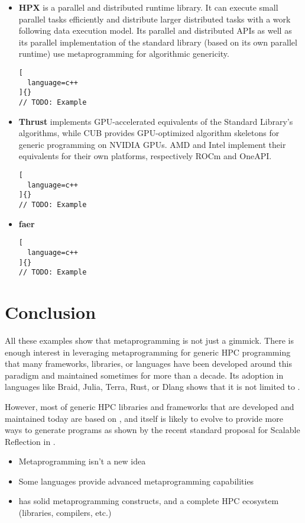 \documentclass[../main]{subfiles}
\begin{document}
\begin{itemize}
\begin{lstlisting}[
  language=c++
]{}
// TODO: Example
\end{lstlisting}

\item
\textbf{HPX} \cite{hpx} is a \cpp parallel and distributed runtime library.
It can execute small parallel tasks efficiently and distribute
larger distributed tasks with a work following data execution model.
Its parallel and distributed APIs as well as its parallel implementation of
the standard library (based on its own parallel runtime) use metaprogramming
for algorithmic genericity.

\begin{lstlisting}[
  language=c++
]{}
// TODO: Example
\end{lstlisting}

\item
\textbf{Thrust} \cite{thrust} implements GPU-accelerated equivalents
of the Standard Library's algorithms, while CUB \cite{cub} provides
GPU-optimized algorithm skeletons for generic programming on NVIDIA GPUs.
AMD and Intel implement their equivalents for their own platforms, respectively
ROCm and OneAPI.

\begin{lstlisting}[
  language=c++
]{}
// TODO: Example
\end{lstlisting}

\item
\textbf{faer} \cite{faer}

\begin{lstlisting}[
  language=c++
]{}
// TODO: Example
\end{lstlisting}

\end{itemize}

\section{
  Conclusion
}

All these examples show that metaprogramming is not just a gimmick.
There is enough interest in leveraging metaprogramming
for generic HPC programming that many frameworks, libraries, or languages
have been developed around this paradigm and maintained sometimes
for more than a decade. Its adoption in languages like Braid, Julia, Terra,
Rust, or Dlang shows that it is not limited to \cpp.

However, most of generic HPC libraries and frameworks that are developed
and maintained today are based on \cpp, and \cpp itself is likely to
evolve to provide more ways to generate programs as shown by the recent
standard proposal for Scalable Reflection in \cpp \cite{scalable-reflection}.

\begin{itemize}
\item Metaprogramming isn't a new idea

\item Some languages provide advanced metaprogramming capabilities

\item \cpp has solid metaprogramming constructs, and a complete HPC ecosystem
(libraries, compilers, etc.)
\end{itemize}
\end{document}
